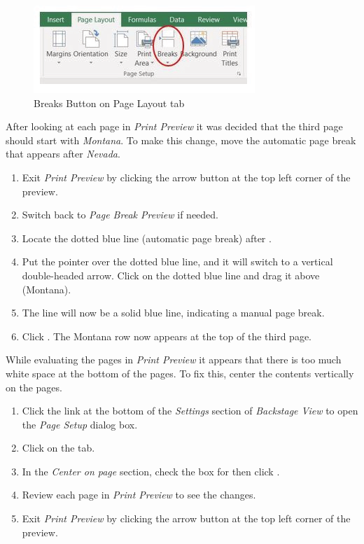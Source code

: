 \begin{figure}[H]
	\centering
	\includegraphics[width=\maxwidth{.95\linewidth}]{gfx/ch03_fig31}
	\caption{Breaks Button on Page Layout tab}
	\label{03:fig31}
\end{figure}

After looking at each page in \textit{Print Preview} it was decided that the third page should start with \textit{Montana}. To make this change, move the automatic page break that appears after \textit{Nevada}.

\begin{enumbox}
	\begin{enumerate}
		\item Exit \textit{Print Preview} by clicking the arrow button at the top left corner of the preview.
		\item Switch back to \textit{Page Break Preview} if needed.
		\item Locate the dotted blue line (automatic page break) after .
		\item Put the pointer over the dotted blue line, and it will switch to a vertical double-headed arrow. Click on the dotted blue line and drag it above  (Montana).
		\item The line will now be a solid blue line, indicating a manual page break.
		\item Click . The Montana row now appears at the top of the third page.
	\end{enumerate}
\end{enumbox}
	
While evaluating the pages in \textit{Print Preview} it appears that there is too much white space at the bottom of the pages. To fix this, center the contents vertically on the pages.

\begin{enumbox}
	\begin{enumerate}
		\item Click the  link at the bottom of the \textit{Settings} section of \textit{Backstage View} to open the \textit{Page Setup} dialog box.
		\item Click on the  tab.
		\item In the \textit{Center on page} section, check the box for  then click .
		\item Review each page in \textit{Print Preview} to see the changes. 
		\item Exit \textit{Print Preview} by clicking the arrow button at the top left corner of the preview.
	\end{enumerate}
\end{enumbox}
	
